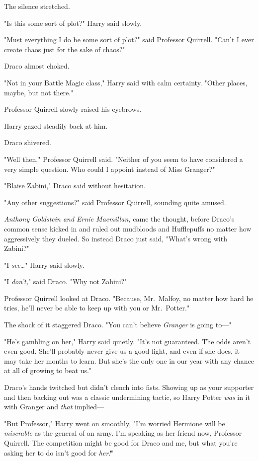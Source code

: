 The silence stretched.

"Is this some sort of plot?" Harry said slowly.

"Must everything I do be some sort of plot?" said Professor Quirrell. "Can't I 
ever create chaos just for the sake of chaos?"

Draco almost choked.

"Not in your Battle Magic class," Harry said with calm certainty. "Other 
places, maybe, but not there."

Professor Quirrell slowly raised his eyebrows.

Harry gazed steadily back at him.

Draco shivered.

"Well then," Professor Quirrell said. "Neither of you seem to have considered a 
very simple question. Who could I appoint instead of Miss Granger?"

"Blaise Zabini," Draco said without hesitation.

"Any other suggestions?" said Professor Quirrell, sounding quite amused.

\emph{Anthony Goldstein and Ernie Macmillan,} came the thought, before Draco's 
common sense kicked in and ruled out mudbloods and Hufflepuffs no matter how 
aggressively they dueled. So instead Draco just said, "What's wrong with 
Zabini?"

"I \emph{see}{\ldots}" Harry said slowly.

"I \emph{don't,}" said Draco. "Why not Zabini?"

Professor Quirrell looked at Draco. "Because, Mr.~Malfoy, no matter how hard he 
tries, he'll never be able to keep up with you or Mr.~Potter."

The shock of it staggered Draco. "You can't believe \emph{Granger} is going 
to---"

"He's gambling on her," Harry said quietly. "It's not guaranteed. The odds 
aren't even good. She'll probably never give us a good fight, and even if she 
does, it may take her months to learn. But she's the only one in our year with 
any chance at all of growing to beat us."

Draco's hands twitched but didn't clench into fists. Showing up as your 
supporter and then backing out was a classic undermining tactic, so Harry 
Potter \emph{was} in it with Granger and \emph{that} implied---

"But Professor," Harry went on smoothly, "I'm worried Hermione will be 
\emph{miserable} as the general of an army. I'm speaking as her friend now, 
Professor Quirrell. The competition might be good for Draco and me, but what 
you're asking her to do isn't good for \emph{her!}"

